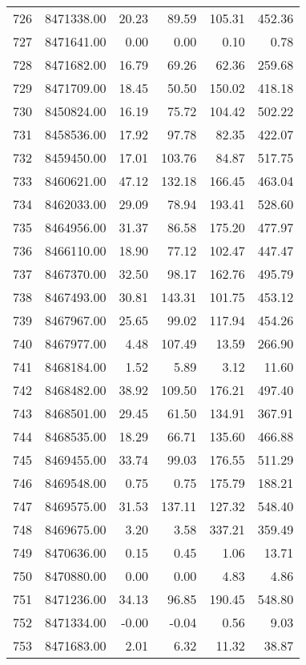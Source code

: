 \begin{table}[ht]
\begin{tabular}{rrrrrr}
  726 & 8471338.00 & 20.23 & 89.59 & 105.31 & 452.36 \\ 
  727 & 8471641.00 & 0.00 & 0.00 & 0.10 & 0.78 \\ 
  728 & 8471682.00 & 16.79 & 69.26 & 62.36 & 259.68 \\ 
  729 & 8471709.00 & 18.45 & 50.50 & 150.02 & 418.18 \\ 
  730 & 8450824.00 & 16.19 & 75.72 & 104.42 & 502.22 \\ 
  731 & 8458536.00 & 17.92 & 97.78 & 82.35 & 422.07 \\ 
  732 & 8459450.00 & 17.01 & 103.76 & 84.87 & 517.75 \\ 
  733 & 8460621.00 & 47.12 & 132.18 & 166.45 & 463.04 \\ 
  734 & 8462033.00 & 29.09 & 78.94 & 193.41 & 528.60 \\ 
  735 & 8464956.00 & 31.37 & 86.58 & 175.20 & 477.97 \\ 
  736 & 8466110.00 & 18.90 & 77.12 & 102.47 & 447.47 \\ 
  737 & 8467370.00 & 32.50 & 98.17 & 162.76 & 495.79 \\ 
  738 & 8467493.00 & 30.81 & 143.31 & 101.75 & 453.12 \\ 
  739 & 8467967.00 & 25.65 & 99.02 & 117.94 & 454.26 \\ 
  740 & 8467977.00 & 4.48 & 107.49 & 13.59 & 266.90 \\ 
  741 & 8468184.00 & 1.52 & 5.89 & 3.12 & 11.60 \\ 
  742 & 8468482.00 & 38.92 & 109.50 & 176.21 & 497.40 \\ 
  743 & 8468501.00 & 29.45 & 61.50 & 134.91 & 367.91 \\ 
  744 & 8468535.00 & 18.29 & 66.71 & 135.60 & 466.88 \\ 
  745 & 8469455.00 & 33.74 & 99.03 & 176.55 & 511.29 \\ 
  746 & 8469548.00 & 0.75 & 0.75 & 175.79 & 188.21 \\ 
  747 & 8469575.00 & 31.53 & 137.11 & 127.32 & 548.40 \\ 
  748 & 8469675.00 & 3.20 & 3.58 & 337.21 & 359.49 \\ 
  749 & 8470636.00 & 0.15 & 0.45 & 1.06 & 13.71 \\ 
  750 & 8470880.00 & 0.00 & 0.00 & 4.83 & 4.86 \\ 
  751 & 8471236.00 & 34.13 & 96.85 & 190.45 & 548.80 \\ 
  752 & 8471334.00 & -0.00 & -0.04 & 0.56 & 9.03 \\ 
  753 & 8471683.00 & 2.01 & 6.32 & 11.32 & 38.87 \\ 

\end{tabular}
\end{table}
